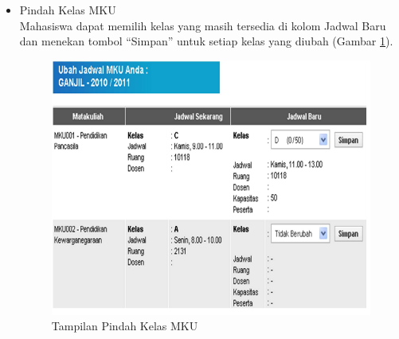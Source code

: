 \documentclass[a4paper,twoside]{article}
\begin{document}
\begin{enumerate}
\begin{enumerate}
\begin{enumerate}
\begin{itemize}
\begin{itemize}
			\item Pindah Kelas MKU \\
			Mahasiswa dapat memilih kelas yang masih tersedia di kolom Jadwal Baru dan menekan tombol ``Simpan'' untuk setiap kelas yang diubah (Gambar \ref{fig:3_pam_utama_pindahmku}). 
			\begin{figure}[H]
				\centering
				\includegraphics[scale=0.5]{Gambar/pam-utama-pindahmku}
				\caption{Tampilan Pindah Kelas MKU\cite{BTI:2012}} 
				\label{fig:3_pam_utama_pindahmku}
			\end{figure}

		\end{itemize}
		

\end{itemize}
\end{enumerate}
\end{enumerate}
\end{enumerate}
\end{document}
